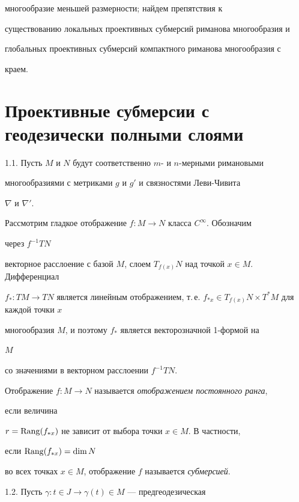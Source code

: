 многообразие меньшей размерности; найдем препятствия к 


существованию локальных проективных субмерсий риманова многообразия и 


глобальных проективных субмерсий компактного риманова многообразия с 


краем. 


 


\section{Проективные субмерсии с геодезически полными слоями} 


 


1.1. Пусть $M$ и $N$ будут соответственно $m$- и $n$-мерными римановыми 


многообразиями с метриками $g$ и $g'$ и связностями Леви-Чивита 


$\nabla$ и $\nabla'$. 


Рассмотрим гладкое отображение $f:M\to N$ класса $C^\infty$. Обозначим 


через $f^{-1}TN$ 


векторное расслоение с базой $M$, слоем $T_{f(x)}N$ над точкой $x\in 


M$. Дифференциал 


$f_*:TM\to TN$ является линейным отображением, т.\,е. $f_{*x}\in 


T_{f(x)}N\times T^*M$ для каждой точки $x$ 


многообразия $M$, и поэтому $f_*$ является векторозначной 1-формой на 


$M$ 


со значениями в векторном расслоении $f^{-1}TN$. 


 


Отображение $f:M\to N$ называется {\it отображением постоянного ранга}, 


если величина 


$r=\operatorname{Rang}(f_{*x})$ не зависит от выбора точки $x\in M$. В частности, 


если $\operatorname{Rang}(f_{*x})=\dim N$ 


во всех точках $x\in M$, отображение $f$ называется {\it субмерсией}. 


\medskip 


 


1.2. Пусть $\gamma:t\in J\to\gamma(t)\in M$ --- предгеодезическая 


